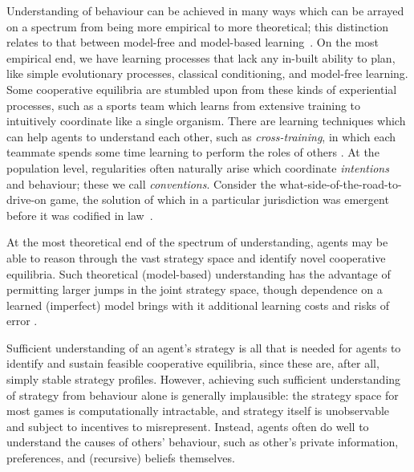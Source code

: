 \documentclass[11pt, a4paper, logo, onecolumn, nonumbering]{deepmind}
\begin{document}
Understanding of behaviour can be achieved in many ways which can be arrayed on a spectrum from being more empirical to more theoretical; this distinction relates to that between model-free and model-based learning~\cite{dayan2009goal}. On the most empirical end, we have learning processes that lack any in-built ability to plan, like simple evolutionary processes, classical conditioning, and model-free learning. Some cooperative equilibria are stumbled upon from these kinds of experiential processes, such as a sports team which learns from extensive training to intuitively coordinate like a single organism. There are learning techniques which can help agents to understand each other, such as \textit{cross-training}, in which each teammate spends some time learning to perform the roles of others \cite{nikolaidis2015improved}.  At the population level, regularities often naturally arise which coordinate \textit{intentions} and behaviour; these we call \textit{conventions}. Consider the what-side-of-the-road-to-drive-on game, the solution of which in a particular jurisdiction was emergent before it was codified in law~\cite{young1996economics}. %

At the most theoretical end of the spectrum of understanding, agents may be able to reason through the vast strategy space and identify novel cooperative equilibria. Such theoretical (model-based) understanding has the advantage of permitting larger jumps in the joint strategy space, though dependence on a learned (imperfect) model brings with it additional learning costs and risks of error \cite{huys2015interplay}. 

Sufficient understanding of an agent's strategy is all that is needed for agents to identify and sustain feasible cooperative equilibria, since these are, after all, simply stable strategy profiles. However, achieving such sufficient understanding of strategy from behaviour alone is generally implausible: the strategy space for most games is computationally intractable, and strategy itself is unobservable and subject to incentives to misrepresent. Instead, agents often do well to understand the causes of others' behaviour, such as other's private information, preferences, and (recursive) beliefs themselves.
\end{document}
